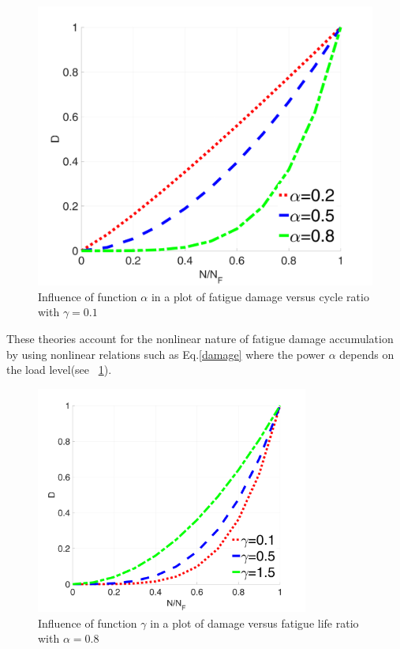 \documentclass[3p,times,procedia,number]{elsarticle}
\newcommand{\figref}[1]{\figurename~\ref{#1}}
\begin{document}
\begin{figure}[h!]
	\centering
	\includegraphics[width=\textwidth]{figures//Dratio1.png}
	\vspace{-12pt}
	\caption{Influence of function $\alpha$ in a plot of fatigue damage versus cycle ratio with $\gamma=0.1$}
	\label{Alpha}
\end{figure}
These theories account for the nonlinear nature of fatigue damage accumulation by using nonlinear relations such as Eq.\eqref{damage} where the power $\alpha$ depends on the load level(see \figref{Alpha}).


\begin{figure}[h!]
	\centering
	\includegraphics[width=0.8\textwidth]{figures//Dratio2.png}
	\vspace{-12pt}
	\caption{Influence of function $\gamma$ in a plot of  damage versus fatigue life ratio with $\alpha=0.8$}
\end{figure}
\end{document}

